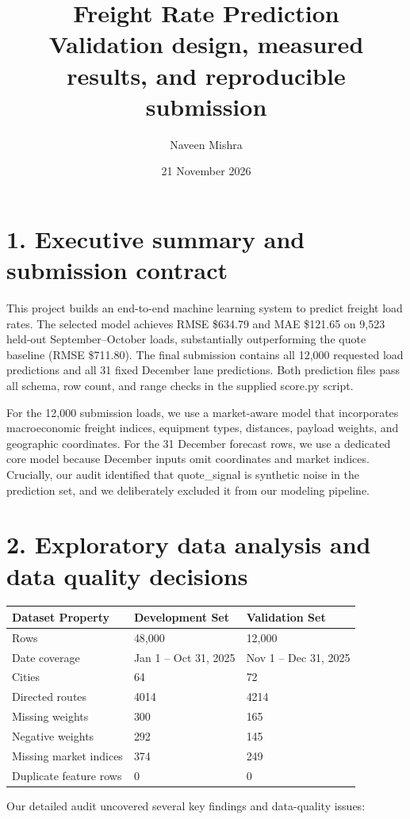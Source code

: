 \documentclass[10pt]{article}
\title{Freight Rate Prediction\\\large Validation design, measured results, and reproducible submission}
\author{Naveen Mishra}
\date{21 November 2026}
\begin{document}
\maketitle
\section*{1. Executive summary and submission contract}
This project builds an end-to-end machine learning system to predict freight load rates. The selected model achieves RMSE \$634.79 and MAE \$121.65 on 9,523 held-out September--October loads, substantially outperforming the quote baseline (RMSE \$711.80). The final submission contains all 12,000 requested load predictions and all 31 fixed December lane predictions. Both prediction files pass all schema, row count, and range checks in the supplied score.py script.

For the 12,000 submission loads, we use a market-aware model that incorporates macroeconomic freight indices, equipment types, distances, payload weights, and geographic coordinates. For the 31 December forecast rows, we use a dedicated core model because December inputs omit coordinates and market indices. Crucially, our audit identified that quote\_signal is synthetic noise in the prediction set, and we deliberately excluded it from our modeling pipeline.

\section*{2. Exploratory data analysis and data quality decisions}
\begin{center}\small\begin{tabular}{lll}\toprule
Dataset Property & Development Set & Validation Set \\ \midrule
Rows & 48,000 & 12,000 \\
Date coverage & Jan 1 -- Oct 31, 2025 & Nov 1 -- Dec 31, 2025 \\
Cities & 64 & 72 \\
Directed routes & 4014 & 4214 \\
Missing weights & 300 & 165 \\
Negative weights & 292 & 145 \\
Missing market indices & 374 & 249 \\
Duplicate feature rows & 0 & 0 \\
\bottomrule\end{tabular}\end{center}
Our detailed audit uncovered several key findings and data-quality issues:
\end{document}
